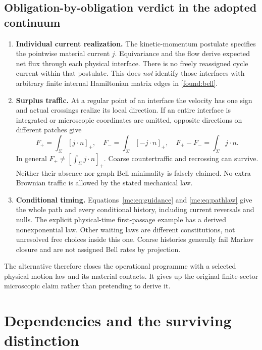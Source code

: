 \documentclass[11pt,oneside,openany]{book}
\theoremstyle{definition}
\theoremstyle{remark}\newtheorem{remark}[theorem]{Remark}
\providecommand{\pos}[1]{[#1]_+}
\begin{document}
\subsection{Obligation-by-obligation verdict in the adopted continuum}
\begin{enumerate}
\item \textbf{Individual current realization.} The kinetic-momentum postulate specifies the pointwise material current $j$. Equivariance and the flow derive expected net flux through each physical interface. There is no freely reassigned cycle current within that postulate. This does \emph{not} identify those interfaces with arbitrary finite internal Hamiltonian matrix edges in \eqref{found:bell}.
\item \textbf{Surplus traffic.} At a regular point of an interface the velocity has one sign and actual crossings realize its local direction. If an entire interface is integrated or microscopic coordinates are omitted, opposite directions on different patches give
\[
 F_+=\int_\Sigma\pos{j\cdot n},\quad F_-=\int_\Sigma\pos{-j\cdot n},\quad
 F_+-F_-=\int_\Sigma j\cdot n.
\]
In general $F_+\ne[\int_\Sigma j\cdot n]_+$. Coarse countertraffic and recrossing can survive. Neither their absence nor graph Bell minimality is falsely claimed. No extra Brownian traffic is allowed by the stated mechanical law.
\item \textbf{Conditional timing.} Equations~\eqref{mc:eq:guidance} and \eqref{mc:eq:pathlaw} give the whole path and every conditional history, including current reversals and nulls. The explicit physical-time first-passage example has a derived nonexponential law. Other waiting laws are different constitutions, not unresolved free choices inside this one. Coarse histories generally fail Markov closure and are not assigned Bell rates by projection.
\end{enumerate}
The alternative therefore closes the operational programme with a selected physical motion law and its material contacts. It gives up the original finite-sector microscopic claim rather than pretending to derive it.

\section{Dependencies and the surviving distinction}
\label{mc:dependencies}
\end{document}
